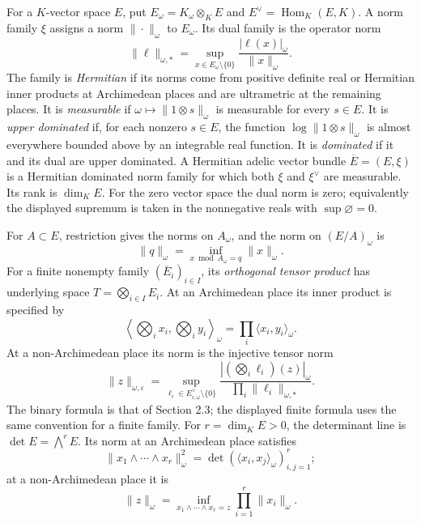 \begin{definition}
\label{def:hermitian-adelic-bundle}
\leanok
For a $K$-vector space $E$, put $E_\omega=K_\omega\otimes_K E$ and
$E^\vee=\operatorname{Hom}_K(E,K)$. A norm family $\xi$ assigns a norm
$\|\cdot\|_\omega$ to $E_\omega$. Its dual family is the operator norm
\[
 \|\ell\|_{\omega,*}
   =\sup_{x\in E_\omega\setminus\{0\}}
       \frac{|\ell(x)|_\omega}{\|x\|_\omega}.
\]
The family is \emph{Hermitian} if its norms come from positive definite real
or Hermitian inner products at Archimedean places and are ultrametric at
the remaining places. It is \emph{measurable} if
$\omega\mapsto\|1\otimes s\|_\omega$ is measurable for every $s\in E$.
It is \emph{upper dominated} if, for each nonzero $s\in E$, the function
$\log\|1\otimes s\|_\omega$ is almost everywhere bounded above by an
integrable real function. It is \emph{dominated} if it and its dual are
upper dominated. A Hermitian adelic vector bundle
$\overline E=(E,\xi)$ is a Hermitian dominated norm family for which both
$\xi$ and $\xi^\vee$ are measurable. Its rank is $\dim_K E$.
For the zero vector space the dual norm is zero; equivalently the displayed
supremum is taken in the nonnegative reals with $\sup\varnothing=0$.
\end{definition}

\begin{definition}
\label{def:adelic-induced-norms}
\leanok
For $A\subset E$, restriction gives the norms on $A_\omega$, and the
norm on $(E/A)_\omega$ is
\[
 \|q\|_\omega=\inf_{x\bmod A_\omega=q}\|x\|_\omega.
\]
For a finite nonempty family $(\overline E_i)_{i\in I}$, its
\emph{orthogonal tensor product} has underlying space
$T=\bigotimes_{i\in I}E_i$. At an Archimedean place its inner product is
specified by
\[
 \left\langle\bigotimes_i x_i,\bigotimes_i y_i\right\rangle_\omega
       =\prod_i\langle x_i,y_i\rangle_\omega.
\]
At a non-Archimedean place its norm is the injective tensor norm
\[
 \|z\|_{\omega,\varepsilon}
   =\sup_{\ell_i\in E_{i,\omega}^\vee\setminus\{0\}}
        \frac{|(\bigotimes_i\ell_i)(z)|_\omega}
             {\prod_i\|\ell_i\|_{\omega,*}}.
\]
The binary formula is that of Section 2.3; the displayed finite formula
uses the same convention for a finite family.
For $r=\dim_K E>0$, the determinant line is $\det E=\bigwedge^r E$.
Its norm at an Archimedean place satisfies
\[
 \|x_1\wedge\cdots\wedge x_r\|_\omega^2
    =\det(\langle x_i,x_j\rangle_\omega)_{i,j=1}^r;
\]
at a non-Archimedean place it is
\[
 \|z\|_\omega
    =\inf_{x_1\wedge\cdots\wedge x_r=z}\prod_{i=1}^r\|x_i\|_\omega.
\]
\end{definition}

